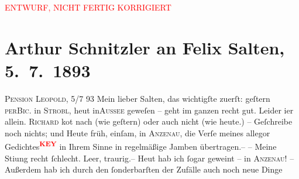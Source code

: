 
\begin{center}
            \textcolor{red}{ENTWURF, NICHT FERTIG KORRIGIERT}
                      \end{center}
            
         
         \newcommand{\erwaehntePersonen}{Personen: Richard Beer-Hofmann, Paul Horn, Josef Jarno, Felix Salten, Richard Specht, Ignaz Wild, Grethe Wreden}
         \newcommand{\erwaehnteInstitutionen}{}
         \newcommand{\erwaehnteOrte}{Orte: Anzenau, Bad Aussee, Bad Ischl, Hotel und Pension Rudolfshöhe (Leopold Petter), Salzburg, Strobl, Wien}
         \newcommand{\erwaehnteWerke}{Werke: Abschiedssouper, Das Märchen. Schauspiel in drei Aufzügen, Die Frage an das Schicksal}
               \section[Arthur Schnitzler an Felix Salten, 5. 7. 1893]{ Arthur Schnitzler an Felix Salten, 5. 7. 1893}\nopagebreak{}\rehead{ }\begin{ledgroupsized}[t]{13cm}\normalsize\beginnumbering \toendnotes[C]{\smallbreak\pagebreak[2]} 
\toendnotes[C]{\smallbreak}\pstart
           \raggedleft{}{\pb}\textsc{Pension Leopold}, 5/7 93\pend
           \pstart{}Mein lieber Salten,\pend\pstart
           das wichtigſte zuerſt: geſtern \textsc{per}\textsc{Bic.} in \textsc{Strobl}, heut in\textsc{Aussee} geweſen – geht im ganzen recht gut. Leider i{\geminationm}er allein. \textsc{Richard} ko{\geminationm}t nach (wie geſtern) oder auch nicht (wie heute.) – Geſchreibe noch nichts;
               und {\pb}Heute früh, einſam, in \textsc{Anzenau}, die Verſe meines allegor Gedichtes\textcolor{red}{\textsuperscript{\textbf{KEY}}} in Ihrem Sinne
               in regelmäßige Jamben übertragen.– – Meine Sti{\geminationm}ung recht ſchlecht. Leer, traurig.–
               Heut hab ich ſogar geweint – in \textsc{Anzenau}! – Außerdem hab ich durch den ſonderbarſten der Zufälle auch noch neue Dinge

\end{ledgroupsized}
